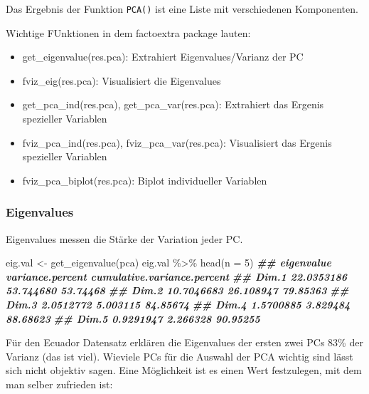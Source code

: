 \documentclass[
]{article}
\newenvironment{Shaded}{\begin{snugshade}}{\end{snugshade}}
\newcommand{\AttributeTok}[1]{\textcolor[rgb]{0.77,0.63,0.00}{#1}}
\newcommand{\DecValTok}[1]{\textcolor[rgb]{0.00,0.00,0.81}{#1}}
\newcommand{\DocumentationTok}[1]{\textcolor[rgb]{0.56,0.35,0.01}{\textbf{\textit{#1}}}}
\newcommand{\FunctionTok}[1]{\textcolor[rgb]{0.00,0.00,0.00}{#1}}
\newcommand{\NormalTok}[1]{#1}
\newcommand{\OtherTok}[1]{\textcolor[rgb]{0.56,0.35,0.01}{#1}}
\newcommand{\SpecialCharTok}[1]{\textcolor[rgb]{0.00,0.00,0.00}{#1}}
\providecommand{\tightlist}{%
  \setlength{\itemsep}{0pt}\setlength{\parskip}{0pt}}
\begin{document}
Das Ergebnis der Funktion \texttt{PCA()} ist eine Liste mit verschiedenen Komponenten.

Wichtige FUnktionen in dem factoextra package lauten:

\begin{itemize}
\tightlist
\item
  get\_eigenvalue(res.pca): Extrahiert Eigenvalues/Varianz der PC
\item
  fviz\_eig(res.pca): Visualisiert die Eigenvalues
\item
  get\_pca\_ind(res.pca), get\_pca\_var(res.pca): Extrahiert das Ergenis spezieller Variablen
\item
  fviz\_pca\_ind(res.pca), fviz\_pca\_var(res.pca): Visualisiert das Ergenis spezieller Variablen
\item
  fviz\_pca\_biplot(res.pca): Biplot individueller Variablen
\end{itemize}

\hypertarget{eigenvalues}{%
\subsubsection{Eigenvalues}\label{eigenvalues}}

Eigenvalues messen die Stärke der Variation jeder PC.

\begin{Shaded}
\begin{Highlighting}[]
\NormalTok{eig.val }\OtherTok{\textless{}{-}} \FunctionTok{get\_eigenvalue}\NormalTok{(pca)}
\NormalTok{eig.val }\SpecialCharTok{\%\textgreater{}\%}
  \FunctionTok{head}\NormalTok{(}\AttributeTok{n =} \DecValTok{5}\NormalTok{)}
\DocumentationTok{\#\#       eigenvalue variance.percent cumulative.variance.percent}
\DocumentationTok{\#\# Dim.1 22.0353186        53.744680                    53.74468}
\DocumentationTok{\#\# Dim.2 10.7046683        26.108947                    79.85363}
\DocumentationTok{\#\# Dim.3  2.0512772         5.003115                    84.85674}
\DocumentationTok{\#\# Dim.4  1.5700885         3.829484                    88.68623}
\DocumentationTok{\#\# Dim.5  0.9291947         2.266328                    90.95255}
\end{Highlighting}
\end{Shaded}

Für den Ecuador Datensatz erklären die Eigenvalues der ersten zwei PCs 83\% der Varianz (das ist viel). Wieviele PCs für die Auswahl der PCA wichtig sind lässt sich nicht objektiv sagen. Eine Möglichkeit ist es einen Wert festzulegen, mit dem man selber zufrieden ist:
\end{document}
